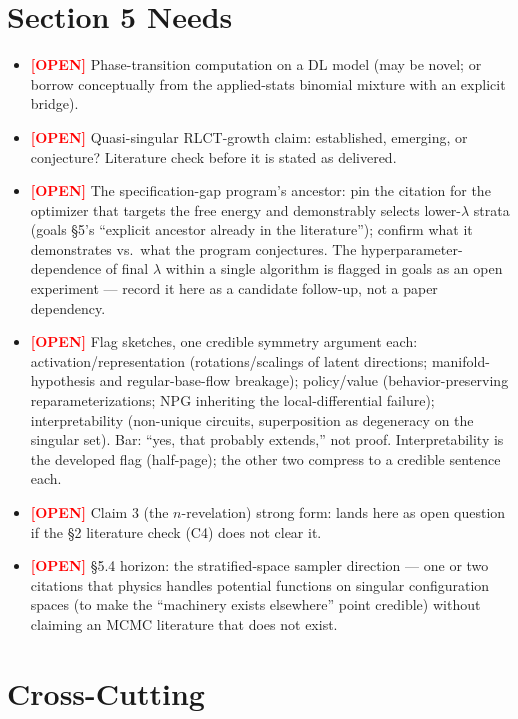 \documentclass[11pt]{article}
\newcommand{\open}{\textcolor{red}{\textbf{[OPEN]}} }
\begin{document}
\section{Section 5 Needs}

\begin{itemize}[itemsep=4pt]
\item \open Phase-transition computation on a DL model (may be novel; or
borrow conceptually from the applied-stats binomial mixture with an
explicit bridge).
\item \open Quasi-singular RLCT-growth claim: established, emerging, or
conjecture? Literature check before it is stated as delivered.
\item \open The specification-gap program's ancestor: pin the citation
for the optimizer that targets the free energy and demonstrably selects
lower-$\lambda$ strata (goals \S5's ``explicit ancestor already in the
literature''); confirm what it demonstrates vs.\ what the program
conjectures. The hyperparameter-dependence of final $\lambda$ within a
single algorithm is flagged in goals as an open experiment --- record it
here as a candidate follow-up, not a paper dependency.
\item \open Flag sketches, one credible symmetry argument each:
activation/representation (rotations/scalings of latent directions;
manifold-hypothesis and regular-base-flow breakage); policy/value
(behavior-preserving reparameterizations; NPG inheriting the
local-differential failure); interpretability (non-unique circuits,
superposition as degeneracy on the singular set). Bar: ``yes, that
probably extends,'' not proof. Interpretability is the developed flag
(half-page); the other two compress to a credible sentence each.
\item \open Claim 3 (the $n$-revelation) strong form: lands here as open
question if the \S2 literature check (C4) does not clear it.
\item \open \S5.4 horizon: the stratified-space sampler direction ---
one or two citations that physics handles potential functions on
singular configuration spaces (to make the ``machinery exists
elsewhere'' point credible) without claiming an MCMC literature that
does not exist.
\end{itemize}

\section{Cross-Cutting}
\end{document}
